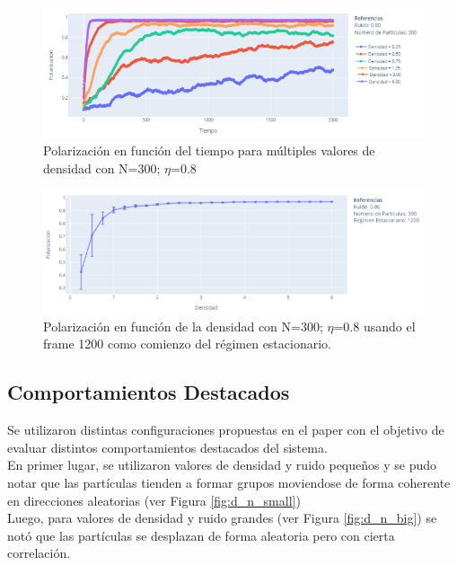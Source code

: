 \documentclass[12pt, a4paper]{report}
\begin{document}
\begin{figure}[h]
\includegraphics[scale=0.5]{density_pola_vs_time.png}
\centering 
\caption{Polarización en función del tiempo para múltiples valores de densidad con N=300; $\eta$=0.8}
\label{fig:density_pola_vs_time}
\end{figure}

\begin{figure}[h]
\includegraphics[scale=0.5]{pola_vs_density.png}
\centering 
\caption{Polarización en función de la densidad con N=300; $\eta$=0.8 usando el frame 1200 como comienzo del régimen estacionario.}
\label{fig:pola_vs_density}
\end{figure}

\subsection{Comportamientos Destacados}

Se utilizaron distintas configuraciones propuestas en el paper \cite{vicsek1995novel} con el objetivo de evaluar distintos comportamientos destacados del sistema.\\

En primer lugar, se utilizaron valores de densidad y ruido pequeños y se pudo notar que las partículas tienden a formar grupos moviendose de forma coherente en direcciones aleatorias (ver Figura \ref{fig:d_n_small})\\  

Luego, para valores de densidad y ruido grandes (ver Figura \ref{fig:d_n_big}) se notó que las partículas se desplazan de forma aleatoria pero con cierta correlación.\\
\end{document}
